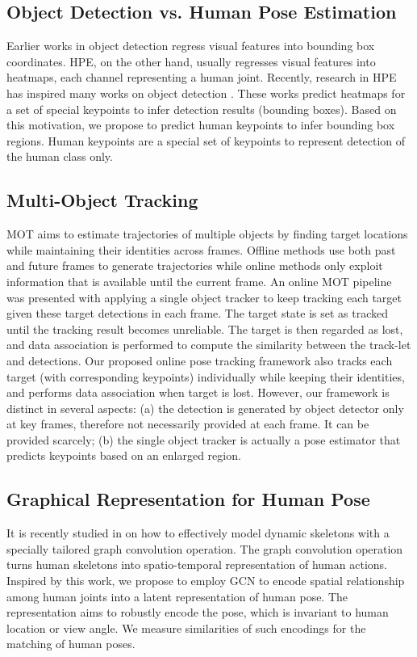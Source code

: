 \documentclass[10pt,twocolumn,letterpaper]{article}
\begin{document}
	
	
	\subsection{Object Detection vs. Human Pose Estimation} 
	Earlier works in object detection regress visual features into bounding box coordinates. HPE, on the other hand, usually regresses visual features into heatmaps, each channel representing a human joint. 
	Recently, research in HPE has inspired many works on object detection \cite{zhou2019bottomup, law2018cornernet, Man+18}. These works predict heatmaps for a set of special keypoints to infer detection results (bounding boxes).
	Based on this motivation,
	we propose to predict human keypoints to infer bounding box regions. Human keypoints are a special set of keypoints to represent detection of the human class only.
	
	\subsection{Multi-Object Tracking}
	MOT aims to estimate trajectories of multiple objects by finding target locations while maintaining their identities across frames.
	Offline methods use both past and future frames to generate trajectories while online methods only exploit information that is available until the current frame.
	An online MOT pipeline \cite{zhu2018online} was presented with applying a single object tracker to keep tracking each target given these target detections in each frame. The target state is set as tracked until the tracking result becomes unreliable. The target is then regarded as lost, and data association is performed to compute the similarity between the track-let and detections. 
	Our proposed online pose tracking framework also tracks each target (with corresponding keypoints) individually while keeping their identities, and performs data association when target is lost. However, our framework is distinct in several aspects: (a) the detection is generated by object detector only at key frames, therefore not necessarily provided at each frame. It can be provided scarcely; (b) the single object tracker is actually a pose estimator that predicts keypoints based on an enlarged region.
	
	\subsection{Graphical Representation for Human Pose} 
	It is recently studied in \cite{stgcn2018aaai} on how to effectively model dynamic skeletons with a specially tailored graph convolution operation. The graph convolution operation turns human skeletons into spatio-temporal representation of human actions. Inspired by this work, we propose to employ GCN to encode spatial relationship among human joints into a latent representation of human pose. The representation aims to robustly encode the pose, which is invariant to human location or view angle. 
We measure similarities of such encodings for the matching of human poses. 
	
\end{document}
